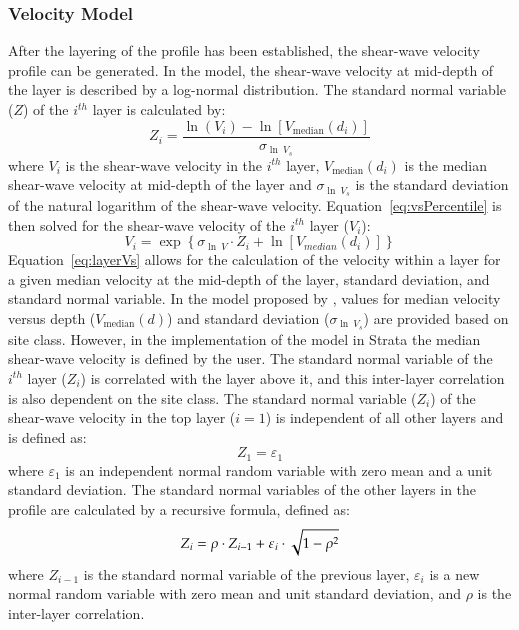 \documentclass[11pt]{report}
\begin{document}
\subsubsection{Velocity Model}

After the layering of the profile has been established, the shear-wave velocity profile can be
generated.  In the \citet{toro:95} model, the shear-wave velocity at mid-depth of the layer is
described by a log-normal distribution.  The standard normal variable ($Z$) of the $i^{th}$ layer is
calculated by:
\begin{equation}
  Z_i = \frac{\ln(V_i) - \ln[ V_\text{median}(d_i)]}{\sigma_{\ln\ V_s}}
  \label{eq:vsPercentile}
\end{equation}
where $V_i$ is the shear-wave velocity in the $i^{th}$ layer, $V_\text{median}(d_i)$ is the median
shear-wave velocity at mid-depth of the layer and $\sigma_{\ln\ V_s}$ is the standard deviation of the
natural logarithm of the shear-wave velocity.  Equation~\ref{eq:vsPercentile} is then solved for the
shear-wave velocity of the $i^{th}$ layer ($V_i$):
\begin{equation}
  V_i = \exp \left\{ \sigma_{\ln\ V} \cdot Z_i + \ln \left[ V_{median}(d_i) \right] \right\}
  \label{eq:layerVs}
\end{equation}
Equation~\ref{eq:layerVs} allows for the calculation of the velocity within a layer for a given
median velocity at the mid-depth of the layer, standard deviation, and standard normal variable.  In
the model proposed by \citet{toro:95}, values for median velocity versus depth ($V_\text{median}(d)$) and
standard deviation ($\sigma_{\ln\ V_s}$) are provided based on site class. However, in the
implementation of the \citet{toro:95} model in Strata the median shear-wave velocity is defined by
the user.  The standard normal variable of the $i^{th}$ layer ($Z_i$) is correlated with the layer
above it, and this inter-layer correlation is also dependent on the site class.  The standard normal
variable ($Z_i$) of the shear-wave velocity in the top layer ($i=1$) is independent of all other
layers and is defined as:
\begin{equation}
  Z_1 = \varepsilon_1
\end{equation}
where $\varepsilon_1$ is an independent normal random variable with zero mean and a unit standard
deviation.  The standard normal variables of the other layers in the profile are calculated by a
recursive formula, defined as:
\begin{equation}
  Z_i = \rho \cdot Z_{i-1} + \varepsilon_i \cdot \sqrt{1 - \rho^2} \\
\end{equation}
where $Z_{i-1}$ is the standard normal variable of the previous layer, $\varepsilon_i$ is a new
normal random variable with zero mean and unit standard deviation, and $\rho$ is the inter-layer
correlation.  
\end{document}
